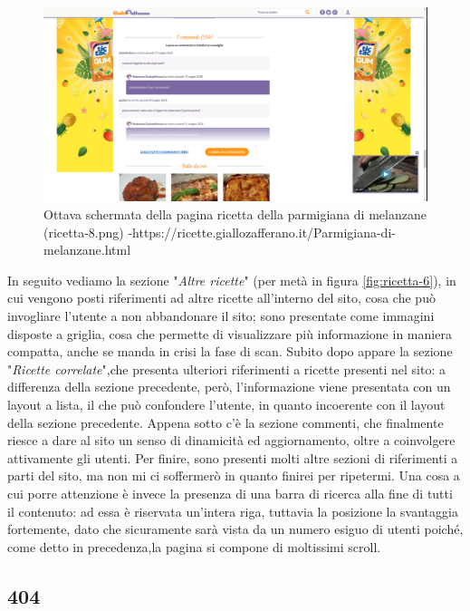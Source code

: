 \begin{figure}[h!]
	\centerline{
	\includegraphics[scale=0.2]{images/ricetta-8.png}}
	\caption{Ottava schermata della pagina ricetta della parmigiana di melanzane (ricetta-8.png) -\newline https://ricette.giallozafferano.it/Parmigiana-di-melanzane.html}
	\label{fig:ricetta-8}
\end{figure}

In seguito vediamo la sezione "\textit{Altre ricette}" (per metà in figura \ref{fig:ricetta-6}), in cui vengono posti riferimenti ad altre ricette all'interno del sito, cosa che può invogliare l'utente a non abbandonare il sito; sono presentate come immagini disposte a griglia, cosa che permette di visualizzare più informazione in maniera compatta, anche se manda in crisi la fase di scan. 
Subito dopo appare la sezione "\textit{Ricette correlate}",che presenta ulteriori riferimenti a ricette presenti nel sito: a differenza della sezione precedente, però, l'informazione viene presentata con un layout a lista, il che può confondere l'utente, in quanto incoerente con il layout della sezione precedente.
Appena sotto c'è la sezione commenti, che finalmente riesce a dare al sito un senso di dinamicità ed aggiornamento, oltre a coinvolgere attivamente gli utenti.
Per finire, sono presenti molti altre sezioni di riferimenti a parti del sito, ma non mi ci soffermerò in quanto finirei per ripetermi. Una cosa a cui porre attenzione è invece la presenza di una barra di ricerca alla fine di tutti il contenuto: ad essa è riservata un'intera riga, tuttavia la posizione la svantaggia fortemente, dato che sicuramente sarà vista da un numero esiguo di utenti poiché, come detto in precedenza,la pagina si compone di moltissimi scroll.

\subsection{404}

